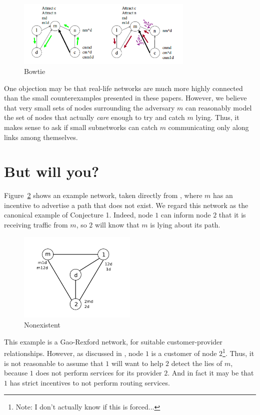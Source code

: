\documentclass[12pt]{article}
\begin{document}
    \begin{figure}[h]
      \centering
      \caption{Bowtie}\label{fig:Bowtie}
      \includegraphics[width=0.75\textwidth]{Bowtie}
    \end{figure}

    One objection may be that real-life networks are much more highly
    connected than the small counterexamples presented in these papers.
    However, we believe that very small sets of nodes surrounding
    the adversary $m$ can reasonably model the set of nodes
    that actually \emph{care} enough to try and catch $m$ lying.
    Thus, it makes sense to ask if small subnetworks can catch $m$
    communicating only along links among themselves.


\section{But will you?}
  Figure~\ref{fig:Nonexistent} shows an example network,
  taken directly from \cite{RoutingGames}, where $m$ has an incentive
  to advertise a path that does not exist.
  We regard this network as the canonical example of Conjecture 1.
  Indeed, node $1$ can inform node $2$ that it is receiving traffic
  from $m$, so $2$ will know that $m$ is lying about its path.
  \begin{figure}[h]
    \centering
    \caption{Nonexistent}\label{fig:Nonexistent}
    \includegraphics[width=0.5\textwidth]{Nonexistent}
  \end{figure}

  This example is a Gao-Rexford network, for suitable customer-provider
  relationships. However, as discussed in \cite{RoutingGames},
  node $1$ is a customer of node $2$\footnote{
    Note: I don't actually know if this is forced...
  }.
  Thus, it is not reasonable to assume that $1$ will want to help
  $2$ detect the lies of $m$, because $1$ does not perform services
  for its provider $2$. And in fact it may be that $1$ has strict incentives to not perform routing services.
  
\end{document}
